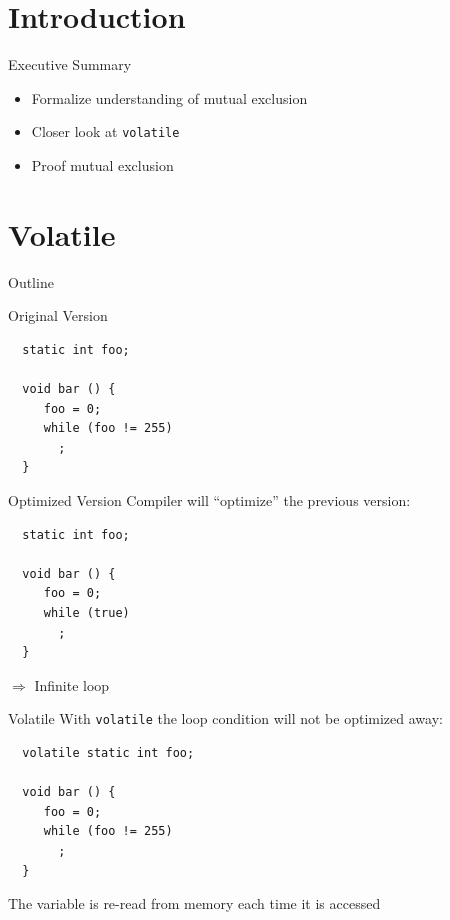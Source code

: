 \section*{Introduction}

\begin{frame}{Executive Summary}
  \begin{itemize}
  \item Formalize understanding of mutual exclusion
  \item Closer look at \lstinline{volatile}
  \item Proof mutual exclusion
  \end{itemize}
\end{frame}


\section{Volatile}

\begin{frame}{Outline}
  \tableofcontents[current]
\end{frame}

\begin{frame}[fragile]{Original Version}
  \begin{lstlisting}
  static int foo;

  void bar () {
     foo = 0;
     while (foo != 255)
       ;
  }
  \end{lstlisting}
\end{frame}

\begin{frame}[fragile]{Optimized Version}
  Compiler will ``optimize'' the previous version:


  \begin{lstlisting}
  static int foo;

  void bar () {
     foo = 0;
     while (true)
       ;
  }
  \end{lstlisting}


  $\Rightarrow$ Infinite loop
\end{frame}

\begin{frame}[fragile]{Volatile}
  With \lstinline!volatile! the loop condition will not be optimized
  away:


  \begin{lstlisting}
  volatile static int foo;

  void bar () {
     foo = 0;
     while (foo != 255)
       ;
  }
  \end{lstlisting}


  The variable is re-read from memory each time it is accessed
\end{frame}

